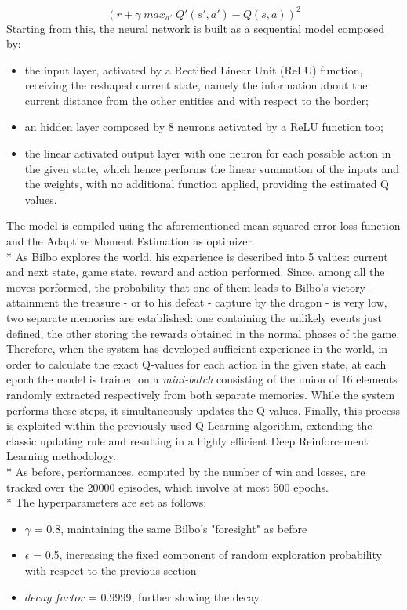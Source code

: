 $$(r+\gamma\;max_{a'}\;Q'(s',a')-Q(s,a))^2$$
Starting from this, the neural network is built as a sequential model composed by:
\begin{itemize}
  \item the input layer, activated by a Rectified Linear Unit (ReLU) function, receiving the reshaped current state, namely the information about the current distance from the other entities and with respect to the border; 
  \item an hidden layer composed by 8 neurons activated by a ReLU function too;
  \item the linear activated output layer with one neuron for each possible action in the given state, which hence performs the linear summation of the inputs and the weights, with no additional function applied, providing the estimated Q values.
\end{itemize}
The model is compiled using the aforementioned mean-squared error loss function and the Adaptive Moment Estimation as optimizer.\\*
As Bilbo explores the world, his experience is described into 5 values: current and next state, game state, reward and action performed. Since, among all the moves performed, the probability that one of them leads to Bilbo's victory - attainment the treasure - or to his defeat - capture by the dragon - is very low, two separate memories are established: one containing the unlikely events just defined, the other storing the rewards obtained in the normal phases of the game. Therefore, when the system has developed sufficient experience in the world, in order to calculate the exact Q-values for each action in the given state, at each epoch the model is trained on a \textit{mini-batch} consisting of the union of 16 elements randomly extracted respectively from both separate memories. While the system performs these steps, it simultaneously updates the Q-values. Finally, this process is exploited within the previously used Q-Learning algorithm, extending the classic updating rule and resulting in a highly efficient Deep Reinforcement Learning methodology.\\*
As before, performances, computed by the number of win and losses, are tracked over the 20000 episodes, which involve at most 500 epochs.\\*
The hyperparameters are set as follows:
\begin{itemize}
  \item $\gamma$ = 0.8, maintaining the same Bilbo's "foresight" as before
  \item $\epsilon$ = 0.5, increasing the fixed component of random exploration probability with respect to the previous section
  \item $decay\;factor$ = 0.9999, further slowing the decay
\end{itemize} 

